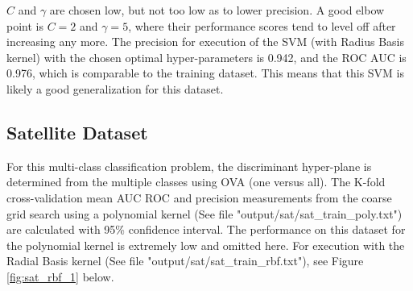 \documentclass[tikz]{article}
\begin{document}
$C$ and $\gamma$ are chosen low, but not too low as to lower precision. A good elbow point is $C = 2$ and $\gamma = 5$, where their performance scores tend to level off after increasing any more. The precision for execution of the SVM (with Radius Basis kernel) with the chosen optimal hyper-parameters is 0.942, and the ROC AUC is 0.976, which is comparable to the training dataset. This means that this SVM is likely a good generalization for this dataset.

\subsection{Satellite Dataset}
\label{sec:sat}
For this multi-class classification problem, the discriminant hyper-plane is determined from the multiple classes using OVA (one versus all). The K-fold cross-validation mean AUC ROC and precision measurements from the coarse grid search using a polynomial kernel (See file "output/sat/sat\_train\_poly.txt") are calculated with 95\% confidence interval. The performance on this dataset for the polynomial kernel is extremely low and omitted here. For execution with the Radial Basis kernel (See file "output/sat/sat\_train\_rbf.txt"), see Figure \ref{fig:sat_rbf_1} below.
\end{document}

